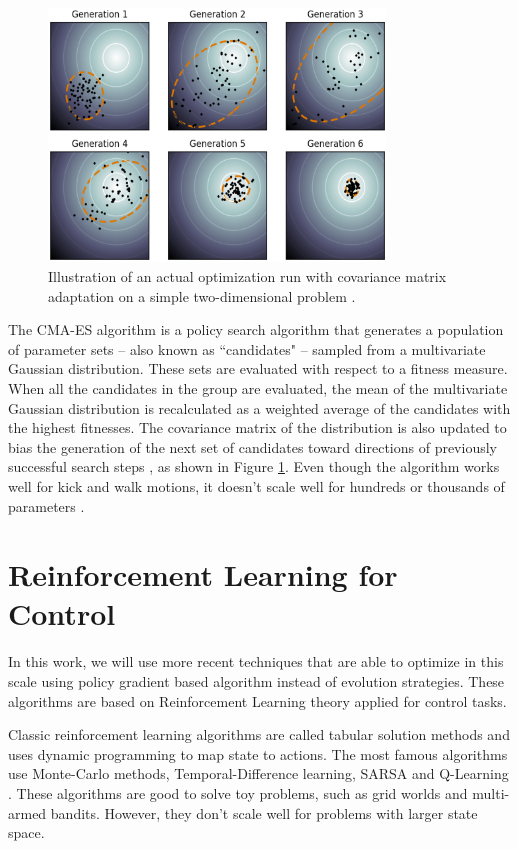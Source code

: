 \begin{figure}[ht!]
	\centering
	\includegraphics[width=0.8\textwidth]{Cap2/CMAES.eps}
	\caption{Illustration of an actual optimization run with covariance matrix adaptation on a simple two-dimensional problem
		\cite{cmaesfig}.}
	\label{cmaesfigure}
\end{figure}

The CMA-ES algorithm is a policy search algorithm that generates a population of parameter sets -- also known as ``candidates" -- sampled from a multivariate Gaussian distribution. These sets are evaluated with respect to a fitness measure. When all the candidates in the group are evaluated, the mean of the multivariate Gaussian
distribution is recalculated as a weighted average of the
candidates with the highest fitnesses. The covariance matrix
of the distribution is also updated to bias the generation
of the next set of candidates toward directions of previously
successful search steps \cite{AAMAS11-urieli}, as shown in Figure \ref{cmaesfigure}. Even though the algorithm works well for kick and walk motions, it doesn't scale well for hundreds or thousands of parameters \cite{mcalpine2017}.


\section{Reinforcement Learning for Control}

In this work, we will use more recent techniques that are able to optimize in this scale using policy gradient based algorithm instead of evolution strategies. These algorithms are based on Reinforcement Learning theory applied for control tasks.

Classic reinforcement learning algorithms are called tabular solution methods and uses dynamic programming to map state to actions. The most famous algorithms use Monte-Carlo methods, Temporal-Difference learning, SARSA \cite{Rummery94on-lineq-learning} and Q-Learning \cite{Watkins:1989}. These algorithms are good to solve toy problems, such as grid worlds and multi-armed bandits. However, they don't scale well for problems with larger state space.

